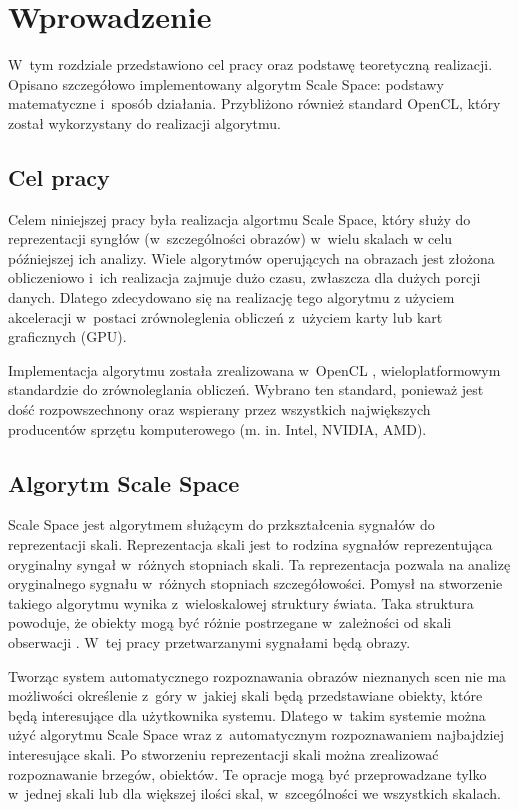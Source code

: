\chapter{Wprowadzenie}
\label{cha:wprowadzenie}

W~tym rozdziale przedstawiono cel pracy oraz podstawę teoretyczną realizacji. Opisano szczegółowo implementowany algorytm Scale Space: podstawy matematyczne i~sposób działania. Przybliżono również standard OpenCL, który został wykorzystany do realizacji algorytmu.


\section{Cel pracy}
\label{sec:cel}
Celem niniejszej pracy była realizacja algortmu Scale Space, który służy do reprezentacji syngłów (w~szczególności obrazów) w~wielu skalach w celu późniejszej ich analizy.
Wiele algorytmów operujących na obrazach jest złożona obliczeniowo i~ich realizacja zajmuje dużo czasu, zwłaszcza dla dużych porcji danych. Dlatego zdecydowano się na realizację tego algorytmu z użyciem akceleracji w~postaci zrównoleglenia obliczeń z~użyciem karty lub kart graficznych (GPU).

Implementacja algorytmu została zrealizowana w~OpenCL \cite{OpenCL}, wieloplatformowym standardzie do zrównoleglania obliczeń. Wybrano ten standard, ponieważ jest dość rozpowszechnony oraz wspierany przez wszystkich największych producentów sprzętu komputerowego (m. in. Intel\textsuperscript{\textregistered}, NVIDIA\textsuperscript{\texttrademark}, AMD).

\section{Algorytm Scale Space}
\label{sec:algorytm}
Scale Space jest algorytmem służącym do przkształcenia sygnałów do reprezentacji skali. Reprezentacja skali jest to rodzina sygnałów reprezentująca oryginalny syngał w~różnych stopniach skali.
Ta reprezentacja pozwala na analizę oryginalnego sygnału w~różnych stopniach szczegółowości.
Pomysł na stworzenie takiego algorytmu wynika z~wieloskalowej struktury świata. Taka struktura powoduje, że obiekty mogą być różnie postrzegane w~zależności od skali obserwacji \cite{Enc09}.
W~tej pracy przetwarzanymi sygnałami będą obrazy.

Tworząc system automatycznego rozpoznawania obrazów nieznanych scen nie ma możliwości określenie z~góry w~jakiej skali będą przedstawiane obiekty, które będą interesujące dla użytkownika systemu. Dlatego w~takim systemie można użyć algorytmu Scale Space wraz z~automatycznym rozpoznawaniem najbajdziej interesujące skali. Po stworzeniu reprezentacji skali można zrealizować rozpoznawanie brzegów, obiektów. Te opracje mogą być przeprowadzane tylko w~jednej skali lub dla większej ilości skal, w~szcególności we wszystkich skalach.


